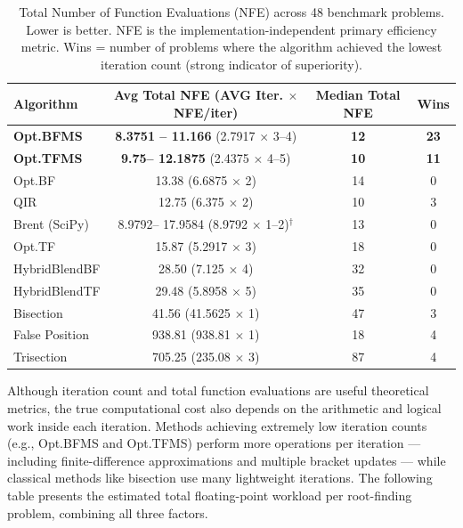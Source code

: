 \documentclass[amsmath, amssymb, aps]{revtex4-2}
\begin{document}
\begin{table}[H]
\centering
\caption{Total Number of Function Evaluations (NFE) across 48 benchmark problems. Lower is better. NFE is the implementation-independent primary efficiency metric. Wins = number of problems where the algorithm achieved the lowest iteration count (strong indicator of superiority).}
\label{tab:nfe_comparison_main}
\begin{tabular}{lccc}
\hline
Algorithm & Avg Total NFE (AVG Iter. $\times$ NFE/iter) & Median Total NFE & Wins \\
\hline
\textbf{Opt.BFMS}           & \textbf{8.3751 -- 11.166}  (2.7917 $\times$ 3--4)   & \textbf{12}     & \textbf{23} \\
\textbf{Opt.TFMS}           & \textbf{9.75-- 12.1875}  (2.4375 $\times$ 4--5)   & \textbf{10}     & \textbf{11} \\
Opt.BF                      & 13.38   (6.6875 $\times$ 2)             & 14              & 0 \\
QIR                         & 12.75   (6.375  $\times$ 2)             & 10              & 3 \\
Brent (SciPy)               & 8.9792-- 17.9584 (8.9792 $\times$ 1--2)$^\dagger$ & 13              & 0 \\
Opt.TF                      & 15.87   (5.2917 $\times$ 3)             & 18              & 0 \\
HybridBlendBF               & 28.50   (7.125  $\times$ 4)             & 32              & 0 \\
HybridBlendTF               & 29.48   (5.8958 $\times$ 5)             & 35              & 0 \\
Bisection                   & 41.56   (41.5625 $\times$ 1)            & 47              & 3 \\
False Position              & 938.81  (938.81 $\times$ 1)             & 18              & 4 \\
Trisection                  & 705.25  (235.08 $\times$ 3)             & 87              & 4 \\
\hline
\end{tabular}
\end{table}

Although iteration count and total function evaluations are useful theoretical metrics, the true computational cost also depends on the arithmetic and logical work inside each iteration. Methods achieving extremely low iteration counts (e.g., Opt.BFMS and Opt.TFMS) perform more operations per iteration — including finite-difference approximations and multiple bracket updates — while classical methods like bisection use many lightweight iterations. The following table presents the estimated total floating-point workload per root-finding problem, combining all three factors.
\end{document}
